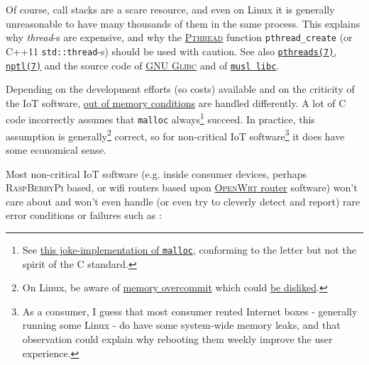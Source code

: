  Of course, call stacks are a scare resource, and even on Linux it is
 generally unreasonable to have many thousands of them in the same
 process. This explains why  \emph{thread}-s are
 expensive, and why the 
 \href{https://computing.llnl.gov/tutorials/pthreads/}{\textsc{Pthread}}
 function \texttt{pthread\_create} (or C++11 \texttt{std::thread}-s)
 should be used with caution. See also
 \href{https://man7.org/linux/man-pages/man7/pthreads.7.html}{\texttt{pthreads(7)}},
   \href{https://man7.org/linux/man-pages/man7/nptl.7.html}{\texttt{nptl(7)}}
     and the source code of 
     \href{https://www.gnu.org/software/libc/}{GNU \textsc{Glibc}} and
     of \href{https://musl.libc.org/}{\texttt{musl libc}}.

 Depending on the development efforts (so costs) available and on the
 criticity of the IoT software,
 \href{https://en.wikipedia.org/wiki/Out_of_memory}{out of memory
   conditions}  are handled differently. A lot of
 C code incorrectly assumes that 
 \texttt{malloc} always\footnote{See
 \href{https://stackoverflow.com/a/8460584/841108}{this
   joke-implementation of \texttt{malloc}}, conforming to the letter
 but not the spirit of the C standard.} succeed. In practice, this
 assumption is generally\footnote{On Linux, be aware of
 \href{http://www.etalabs.net/overcommit.html}{memory overcommit}
 which could \href{https://unix.stackexchange.com/q/441364/50557}{be
   disliked}.}  correct, so for non-critical IoT software\footnote{As
 a consumer, I guess that most consumer rented Internet boxes -
 generally running some Linux - do have some system-wide memory leaks,
 and that observation could explain why rebooting them weekly improve
 the user experience.} it does have some economical sense.


 Most non-critical IoT software (e.g. inside consumer devices, perhaps
  \textsc{RaspBerryPi}
 based, or wifi routers based upon  \href{https://openwrt.org/}{\textsc{OpenWrt} router}
 software) won't care about and won't even handle (or even try to
 cleverly detect and report) rare error conditions or failures
  such as :

